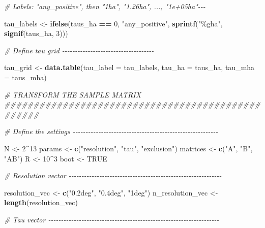 \documentclass[
  11pt,
]{article}
\newenvironment{Shaded}{\begin{snugshade}}{\end{snugshade}}
\newcommand{\AttributeTok}[1]{\textcolor[rgb]{0.13,0.29,0.53}{#1}}
\newcommand{\CommentTok}[1]{\textcolor[rgb]{0.56,0.35,0.01}{\textit{#1}}}
\newcommand{\ConstantTok}[1]{\textcolor[rgb]{0.56,0.35,0.01}{#1}}
\newcommand{\DecValTok}[1]{\textcolor[rgb]{0.00,0.00,0.81}{#1}}
\newcommand{\FunctionTok}[1]{\textcolor[rgb]{0.13,0.29,0.53}{\textbf{#1}}}
\newcommand{\NormalTok}[1]{#1}
\newcommand{\OtherTok}[1]{\textcolor[rgb]{0.56,0.35,0.01}{#1}}
\newcommand{\SpecialCharTok}[1]{\textcolor[rgb]{0.81,0.36,0.00}{\textbf{#1}}}
\newcommand{\StringTok}[1]{\textcolor[rgb]{0.31,0.60,0.02}{#1}}
\begin{document}
\begin{Shaded}
\begin{Highlighting}[]
\CommentTok{\# Labels: "any\_positive", then "1ha", "1.26ha", ..., "1e+05ha"{-}{-}{-}}

\NormalTok{tau\_labels }\OtherTok{\textless{}{-}} \FunctionTok{ifelse}\NormalTok{(taus\_ha }\SpecialCharTok{==} \DecValTok{0}\NormalTok{, }\StringTok{"any\_positive"}\NormalTok{, }\FunctionTok{sprintf}\NormalTok{(}\StringTok{"\%gha"}\NormalTok{, }\FunctionTok{signif}\NormalTok{(taus\_ha, }\DecValTok{3}\NormalTok{)))}

\CommentTok{\# Define tau grid {-}{-}{-}{-}{-}{-}{-}{-}{-}{-}{-}{-}{-}{-}{-}{-}{-}{-}{-}{-}{-}{-}{-}{-}{-}{-}{-}{-}{-}{-}{-}{-}{-}{-}{-}{-}}

\NormalTok{tau\_grid }\OtherTok{\textless{}{-}} \FunctionTok{data.table}\NormalTok{(}\AttributeTok{tau\_label =}\NormalTok{ tau\_labels, }\AttributeTok{tau\_ha =}\NormalTok{ taus\_ha, }\AttributeTok{tau\_mha =}\NormalTok{ taus\_mha)}

\CommentTok{\# TRANSFORM THE SAMPLE MATRIX \#\#\#\#\#\#\#\#\#\#\#\#\#\#\#\#\#\#\#\#\#\#\#\#\#\#\#\#\#\#\#\#\#\#\#\#\#\#\#\#\#\#\#\#\#\#\#\#\#\#}

\CommentTok{\# Define the settings {-}{-}{-}{-}{-}{-}{-}{-}{-}{-}{-}{-}{-}{-}{-}{-}{-}{-}{-}{-}{-}{-}{-}{-}{-}{-}{-}{-}{-}{-}{-}{-}{-}{-}{-}{-}{-}{-}{-}{-}{-}{-}{-}{-}{-}{-}{-}{-}{-}{-}{-}{-}{-}{-}{-}{-}{-}}

\NormalTok{N }\OtherTok{\textless{}{-}} \DecValTok{2}\SpecialCharTok{\^{}}\DecValTok{13}
\NormalTok{params }\OtherTok{\textless{}{-}} \FunctionTok{c}\NormalTok{(}\StringTok{"resolution"}\NormalTok{, }\StringTok{"tau"}\NormalTok{, }\StringTok{"exclusion"}\NormalTok{)}
\NormalTok{matrices }\OtherTok{\textless{}{-}} \FunctionTok{c}\NormalTok{(}\StringTok{"A"}\NormalTok{, }\StringTok{"B"}\NormalTok{, }\StringTok{"AB"}\NormalTok{)}
\NormalTok{R }\OtherTok{\textless{}{-}} \DecValTok{10}\SpecialCharTok{\^{}}\DecValTok{3}
\NormalTok{boot }\OtherTok{\textless{}{-}} \ConstantTok{TRUE}

\CommentTok{\# Resolution vector {-}{-}{-}{-}{-}{-}{-}{-}{-}{-}{-}{-}{-}{-}{-}{-}{-}{-}{-}{-}{-}{-}{-}{-}{-}{-}{-}{-}{-}{-}{-}{-}{-}{-}{-}{-}{-}{-}{-}{-}{-}{-}{-}{-}{-}{-}{-}{-}{-}{-}{-}{-}{-}{-}{-}{-}{-}{-}{-}{-}}

\NormalTok{resolution\_vec }\OtherTok{\textless{}{-}} \FunctionTok{c}\NormalTok{(}\StringTok{"0.2deg"}\NormalTok{, }\StringTok{"0.4deg"}\NormalTok{, }\StringTok{"1deg"}\NormalTok{)}
\NormalTok{n\_resolution\_vec }\OtherTok{\textless{}{-}} \FunctionTok{length}\NormalTok{(resolution\_vec)}

\CommentTok{\# Tau vector {-}{-}{-}{-}{-}{-}{-}{-}{-}{-}{-}{-}{-}{-}{-}{-}{-}{-}{-}{-}{-}{-}{-}{-}{-}{-}{-}{-}{-}{-}{-}{-}{-}{-}{-}{-}{-}{-}{-}{-}{-}{-}{-}{-}{-}{-}{-}{-}{-}{-}{-}{-}{-}{-}{-}{-}{-}{-}{-}{-}{-}{-}{-}{-}{-}{-}{-}}


\end{Highlighting}
\end{Shaded}
\end{document}
